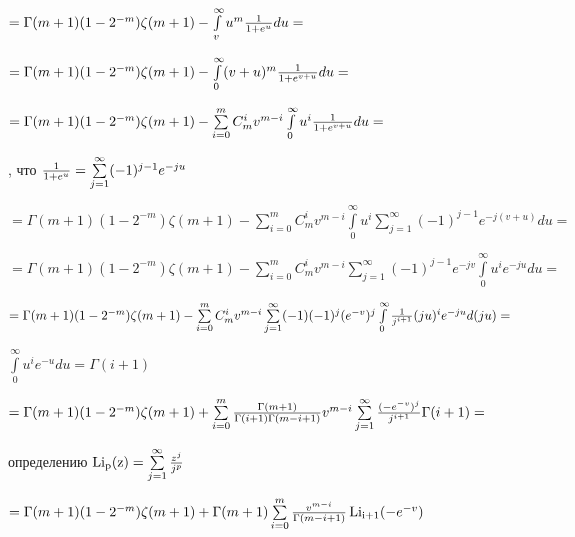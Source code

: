 \documentclass[a4paper,12pt]{article}
\begin{document}
\begin{center}
    $= \Gamma(m + 1)(1 - 2^{- m})\zeta(m + 1) - \int\limits_v^{\infty} u^{m} {1\over{1 + e^{u}}}d u = $
\end{center}

\begin{center}
    $= \Gamma(m + 1)(1 - 2^{- m})\zeta(m + 1) - \int\limits_0^{\infty} (v + u)^{m} {1\over{1 + e^{v + u}}}d u = $
\end{center}

\begin{center}
    $= \Gamma(m + 1)(1 - 2^{- m})\zeta(m + 1) - \sum\limits_{i = 0}^m C_m^i v^{m - i} \int\limits_0^{\infty} u^{i} {1\over{1 + e^{v + u}}}d u = $
\end{center}

, что ${1\over{1 + e^{u}}} = \sum\limits_{j = 1}^{\infty} (-1)^{j - 1}e^{-j u}$

\begin{center}
    $= \Gamma(m + 1)(1 - 2^{- m})\zeta(m + 1) - \sum\limits_{i = 0}^m C_m^i v^{m - i} \int\limits_0^{\infty} u^{i} \sum\limits_{j = 1}^{\infty} (-1)^{j - 1}e^{-j(v + u)}d u = $
\end{center}

\begin{center}
    $= \Gamma(m + 1)(1 - 2^{- m})\zeta(m + 1) - \sum\limits_{i = 0}^m C_m^i v^{m - i} \sum\limits_{j = 1}^{\infty} (-1)^{j - 1}e^{-j v}\int\limits_0^{\infty} u^{i} e^{-j u}d u = $
\end{center}

\begin{center}
    $= \Gamma(m + 1)(1 - 2^{- m})\zeta(m + 1) - \sum\limits_{i = 0}^m C_m^i v^{m - i} \sum\limits_{j = 1}^{\infty} (-1) (-1)^{j} (e^{-v})^j\int\limits_0^{\infty}{1\over{j^{i + 1}}} (j u)^{i} e^{-j u}d (j u) = $
\end{center}

 $\int\limits_0^{\infty} u^{i} e^{-u}d u = \Gamma(i + 1)$

\begin{center}
    $= \Gamma(m + 1)(1 - 2^{- m})\zeta(m + 1) + \sum\limits_{i = 0}^m {\Gamma(m + 1)\over{\Gamma(i + 1) \Gamma(m - i + 1)}} v^{m - i} \sum\limits_{j = 1}^{\infty} {(-e^{-v})^j\over{j^{i + 1}}} \Gamma(i + 1) = $
\end{center}

 определению $\operatorname{Li_p(z)} = \sum\limits_{j = 1}^{\infty} {z^{j}\over{j^p}}$

\begin{center}
    $= \Gamma(m + 1)(1 - 2^{- m})\zeta(m + 1) + \Gamma(m + 1)\sum\limits_{i = 0}^m {v^{m - i}\over{\Gamma(m - i + 1)}} \operatorname{Li_{i + 1}}(-e^{-v})$
\end{center}
\end{document}
